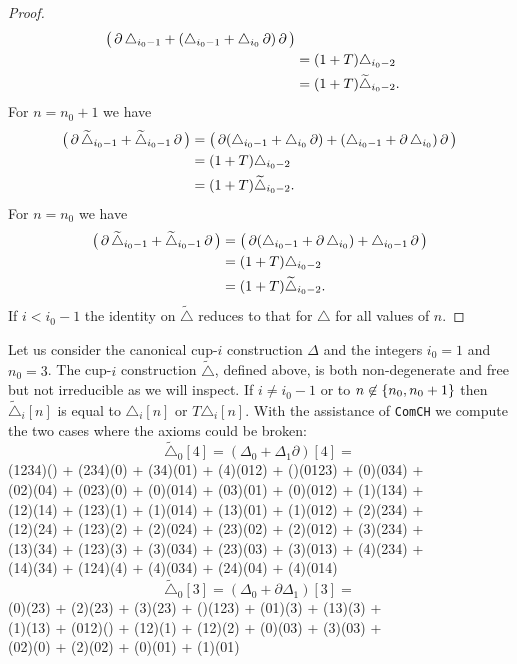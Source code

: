 \begin{proof}
\begin{align*}
		\big(\operatorname{\partial}\triangle_{i_0-1} + (\triangle_{i_0-1} + \triangle_{i_0} \operatorname{\partial})\operatorname{\partial}\big) \\ &=
		(1+T)\triangle_{i_0-2} \\ &=
		(1+T)\widetilde\triangle_{i_0-2}.
	\end{align*}
	For $n = n_0+1$ we have
	\begin{align*}
		\big(\operatorname{\partial}\widetilde\triangle_{i_0-1} + \widetilde\triangle_{i_0-1} \operatorname{\partial}\big) &=
		\big(\operatorname{\partial}(\triangle_{i_0-1} + \triangle_{i_0} \operatorname{\partial}) + (\triangle_{i_0-1} + \operatorname{\partial}\triangle_{i_0})\operatorname{\partial} \big) \\ &=
		(1+T)\triangle_{i_0-2} \\ &=
		(1+T)\widetilde\triangle_{i_0-2}.
	\end{align*}
	For $n = n_0$ we have
	\begin{align*}
		\big(\operatorname{\partial}\widetilde\triangle_{i_0-1} + \widetilde\triangle_{i_0-1} \operatorname{\partial}\big) &=
		\big(\operatorname{\partial}(\triangle_{i_0-1} + \operatorname{\partial}\triangle_{i_0}) + \triangle_{i_0-1}\operatorname{\partial} \big) \\ &=
		(1+T)\triangle_{i_0-2} \\ &=
		(1+T)\widetilde\triangle_{i_0-2}.
	\end{align*}
	If $i<i_0-1$ the identity on $\widetilde\triangle$ reduces to that for $\triangle$ for all values of $n$.
\end{proof}

Let us consider the canonical cup-$i$ construction $\Delta$ and the integers $i_0=1$ and $n_0=3$.
The cup-$i$ construction $\widetilde\triangle$, defined above, is both non-degenerate and free but not irreducible as we will inspect.
If $i \neq i_0-1$ or to $n \not\in \{n_0,n_0+1\}$ then $\widetilde\triangle_i[n]$ is equal to $\triangle_i[n]$ or $T\triangle_i[n]$.
With the assistance of \texttt{ComCH} we compute the two cases where the axioms could be broken:
\[
\widetilde\triangle_0[4] = (\Delta_0 + \Delta_1\partial)[4] =
\]
\noindent
{\ttfamily
	(1234)() + (234)(0) + (34)(01) + (4)(012) + ()(0123) + (0)(034) +\\
	(02)(04) + (023)(0) + (0)(014) + (03)(01) + (0)(012) + (1)(134) +\\
	(12)(14) + (123)(1) + (1)(014) + (13)(01) + (1)(012) + (2)(234) +\\
	(12)(24) + (123)(2) + (2)(024) + (23)(02) + (2)(012) + (3)(234) +\\
	(13)(34) + (123)(3) + (3)(034) + (23)(03) + (3)(013) + (4)(234) +\\
	(14)(34) + (124)(4) + (4)(034) + (24)(04) + (4)(014)}
\[
\widetilde\triangle_0[3] = (\Delta_0 + \partial\Delta_1)[3] =
\]
\noindent
{\ttfamily
	(0)(23) + (2)(23) + (3)(23) + ()(123) + (01)(3) + (13)(3) +\\
	(1)(13) + (012)() + (12)(1) + (12)(2) + (0)(03) + (3)(03) +\\
	(02)(0) + (2)(02) + (0)(01) + (1)(01)}

